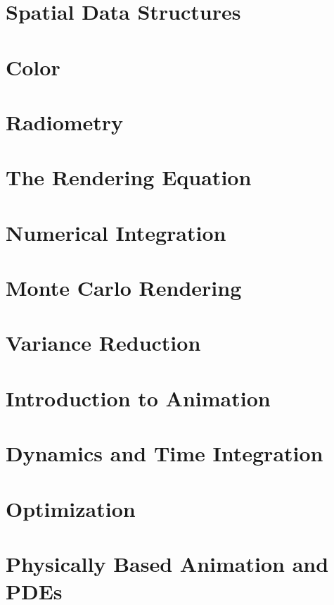 \documentclass{article}
\begin{document}
\section{Spatial Data Structures}
\section{Color}
\section{Radiometry}
\section{The Rendering Equation}
\section{Numerical Integration}
\section{Monte Carlo Rendering}
\section{Variance Reduction}
\section{Introduction to Animation}
\section{Dynamics and Time Integration}
\section{Optimization}
\section{Physically Based Animation and PDEs}
\end{document}

